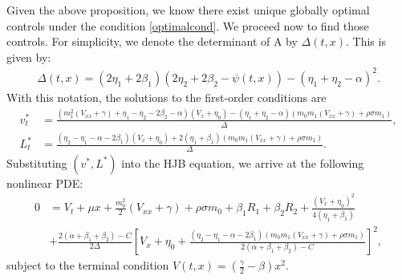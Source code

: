 \documentclass[12pt, letterpaper]{article}
\numberwithin{equation}{section}
\numberwithin{theorem}{section}
\begin{document}
 
Given the above proposition, we know there exist unique globally optimal controls under the condition \eqref{optimalcond}. We proceed now to find those controls. For simplicity, we denote the determinant of A by $\Delta(t,x)$. This is given by: 
\begin{align}
\Delta(t,x)=(2\eta_1+2\beta_1)(2\eta_2+2\beta_2-\psi(t,x))-\left(\eta_1+\eta_2-\alpha\right)^2.
\end{align}
With this notation, the solutions to the first-order conditions are
\begin{equation}\label{eq:optimzers}
\begin{aligned}
v_t^*&=\frac{(m_1^2(V_{xx}+\gamma)+\eta_1-\eta_2-2\beta_2-\alpha)(V_x+\eta_0)-(\eta_1+\eta_2-\alpha)(m_0m_1(V_{xx}+\gamma)+\rho\sigma m_1)}{\Delta},\\
L_t^*&=\frac{(\eta_2-\eta_1-\alpha-2\beta_1)(V_x+\eta_0)+2(\eta_1+\beta_1)(m_0m_1(V_{xx}+\gamma)+\rho\sigma m_1)}{\Delta}. 
\end{aligned}
\end{equation}
Substituting $(v^*, L^*)$    into the HJB equation, we arrive at  the following nonlinear PDE:
\begin{equation}\label{eq:Affine_PDE}
\begin{aligned}
0&=V_t+\mu x+\frac{m_0^2}{2}(V_{xx}+\gamma)+\rho\sigma m_0+\beta_1R_1+\beta_2R_2+\frac{(V_x+\eta_0)^2}{4(\eta_1+\beta_1)}\\
&+\frac{2(\alpha+\beta_1+\beta_2)-C}{2\Delta}\left[V_x+\eta_0+\frac{(\eta_2-\eta_1-\alpha-2\beta_1)(m_0m_1(V_{xx}+\gamma)+\rho\sigma m_1)}{2(\alpha+\beta_1+\beta_2)-C}\right]^2,
\end{aligned}
\end{equation}
subject to the terminal condition $V(t,x)=\left(\frac{\gamma}{2}-\beta\right)x^2$. 
\end{document}
